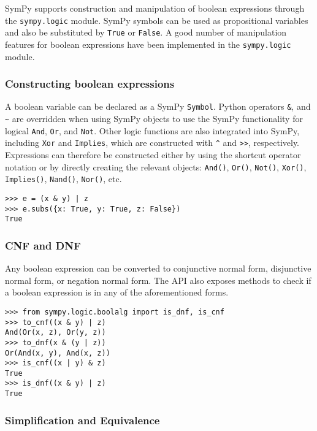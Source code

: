 
SymPy supports construction and manipulation of boolean expressions
through the \texttt{sympy.logic} module. SymPy symbols can be used as
propositional variables and also be substituted by \texttt{True}
or \texttt{False}. A good number of manipulation features for boolean
expressions have been implemented in the \texttt{sympy.logic} module.

\subsubsection{Constructing boolean expressions}

A boolean variable can be declared as a SymPy \verb|Symbol|. Python operators
\texttt{\&}, \texttt{\textbar{}} and \texttt{\textasciitilde{}} are overridden
when using SymPy objects to use the SymPy functionality for logical
\texttt{And}, \texttt{Or}, and \texttt{Not}. Other logic functions are also
integrated into SymPy, including \texttt{Xor} and \texttt{Implies}, which are
constructed with \texttt{\^{}} and \texttt{\textgreater{}\textgreater{}},
respectively. Expressions can therefore be constructed either by using
the shortcut operator notation or by directly creating the relevant
objects: \verb|And()|,
\verb|Or()|, \verb|Not()|, \verb|Xor()|, \verb|Implies()|, \verb|Nand()|,
\verb|Nor()|, etc.

\begin{verbatim}
>>> e = (x & y) | z
>>> e.subs({x: True, y: True, z: False})
True
\end{verbatim}

\subsubsection{CNF and DNF}

Any boolean expression can be converted to conjunctive normal form, disjunctive
normal form, or negation normal form. The API also exposes methods to check if
a boolean expression is in any of the aforementioned forms.

\begin{verbatim}
>>> from sympy.logic.boolalg import is_dnf, is_cnf
>>> to_cnf((x & y) | z)
And(Or(x, z), Or(y, z))
>>> to_dnf(x & (y | z))
Or(And(x, y), And(x, z))
>>> is_cnf((x | y) & z)
True
>>> is_dnf((x & y) | z)
True
\end{verbatim}

\subsubsection{Simplification and Equivalence}

